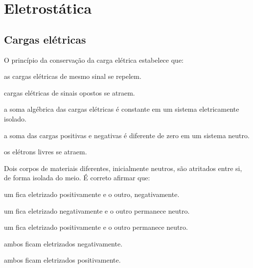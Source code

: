 \providecommand{\fvMeshCW}[3]{
  \draw[->,loopcol,line width=1.1pt] (#1)
    arc[start angle=0,end angle=-305,radius=#2cm];
  \node[loopcol,fill=white,inner sep=1pt] at (#1){\footnotesize #3};}

\section{Eletrostática}

\subsection{Cargas elétricas}

\blocofixacao
\begin{questao}[1]{}

O princípio da conservação da carga elétrica estabelece que:
\begin{alternativas}
\item as cargas elétricas de mesmo sinal se repelem.
\item cargas elétricas de sinais opostos se atraem.
\item a soma algébrica das cargas elétricas é constante em um sistema eletricamente isolado.
\item a soma das cargas positivas e negativas é diferente de zero em um sistema neutro.
\item os elétrons livres se atraem.
\end{alternativas}


\end{questao}
\begin{questao}[1]{}

Dois corpos de materiais diferentes, inicialmente neutros, são atritados entre si,
de forma isolada do meio. É correto afirmar que:
\begin{alternativas}
\item um fica eletrizado positivamente e o outro, negativamente.
\item um fica eletrizado negativamente e o outro permanece neutro.
\item um fica eletrizado positivamente e o outro permanece neutro.
\item ambos ficam eletrizados negativamente.
\item ambos ficam eletrizados positivamente.
\end{alternativas}


\end{questao}
